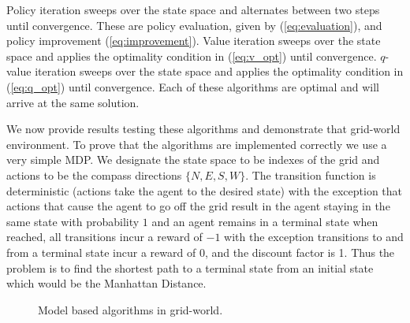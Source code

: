 \documentclass{article}
\begin{document}
Policy iteration sweeps over the state space and alternates between two steps until convergence. These are policy evaluation, given by (\ref{eq:evaluation}), and policy improvement (\ref{eq:improvement}). Value iteration sweeps over the state space and applies the optimality condition in (\ref{eq:v_opt}) until convergence. $q$-value iteration sweeps over the state space and applies the optimality condition in (\ref{eq:q_opt}) until convergence. Each of these algorithms are optimal and will arrive at the same solution.

We now provide results testing these algorithms and demonstrate that grid-world environment. To prove that the algorithms are implemented correctly we use a very simple MDP. We designate the state space to be indexes of the grid and actions to be the compass directions $\{N, E, S, W\}$. The transition function is deterministic (actions take the agent to the desired state) with the exception that actions that cause the agent to go off the grid result in the agent staying in the same state with probability $1$ and an agent remains in a terminal state when reached, all transitions incur a reward of $-1$ with the exception transitions to and from a terminal state incur a reward of $0$, and the discount factor is 1. Thus the problem is to find the shortest path to a terminal state from an initial state which would be the Manhattan Distance.
\begin{figure}[H]
    \centering
    \hfill
    \caption{Model based algorithms in grid-world.}
    \label{fig:model}
\end{figure}
\end{document}
